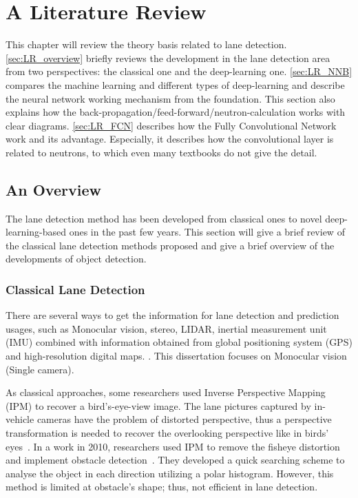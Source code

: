 
\chapter{A Literature Review}
\label{cha:literature}
\begin{spacing}{1.5}
\setlength{\parskip}{0.3in}

This chapter will review the theory basis related to lane detection. \autoref{sec:LR_overview} briefly reviews the development in the lane detection area from two perspectives: the classical one and the deep-learning one. \autoref{sec:LR_NNB} compares the machine learning and different types of deep-learning and describe the neural network working mechanism from the foundation. This section also explains how the back-propagation/feed-forward/neutron-calculation works with clear diagrams. \autoref{sec:LR_FCN} describes how the Fully Convolutional Network work and its advantage. Especially, it describes how the convolutional layer is related to neutrons, to which even many textbooks do not give the detail.

\section{An Overview}
\label{sec:LR_overview}

The lane detection method has been developed from classical ones to novel deep-learning-based ones in the past few years. This section will give a brief review of the classical lane detection methods proposed and give a brief overview of the developments of object detection.

\subsection{Classical Lane Detection}

There are several ways to get the information for lane detection and prediction usages, such as Monocular vision, stereo, LIDAR, inertial measurement unit (IMU) combined with information obtained from global positioning system (GPS) and high-resolution digital maps. \cite{hillel2014recent}. This dissertation focuses on Monocular vision (Single camera).

As classical approaches, some researchers used Inverse Perspective Mapping (IPM) to recover a bird's-eye-view image. The lane pictures captured by in-vehicle cameras have the problem of distorted perspective, thus a perspective transformation is needed to recover the overlooking perspective like in birds' eyes~\cite{luo2010low}. In a work in 2010, researchers used IPM to remove the fisheye distortion and implement obstacle detection~\cite{lin2010construction}. They developed a quick searching scheme to analyse the object in each direction utilizing a polar histogram. However, this method is limited at obstacle's shape; thus, not efficient in lane detection.


\end{spacing}
